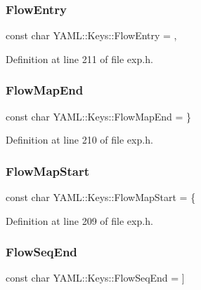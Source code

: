 \subsubsection{\texorpdfstring{FlowEntry}{FlowEntry}}
{\footnotesize\ttfamily const char Y\+A\+M\+L\+::\+Keys\+::\+Flow\+Entry = \textquotesingle{},\textquotesingle{}}



Definition at line 211 of file exp.\+h.

\mbox{\label{namespace_y_a_m_l_1_1_keys_a4522cc6d65a0d481b4ffb93a8885a621}} 
\subsubsection{\texorpdfstring{FlowMapEnd}{FlowMapEnd}}
{\footnotesize\ttfamily const char Y\+A\+M\+L\+::\+Keys\+::\+Flow\+Map\+End = \textquotesingle{}\}\textquotesingle{}}



Definition at line 210 of file exp.\+h.

\mbox{\label{namespace_y_a_m_l_1_1_keys_a0bb61fe31d7890d9801eab02edb407c2}} 
\subsubsection{\texorpdfstring{FlowMapStart}{FlowMapStart}}
{\footnotesize\ttfamily const char Y\+A\+M\+L\+::\+Keys\+::\+Flow\+Map\+Start = \textquotesingle{}\{\textquotesingle{}}



Definition at line 209 of file exp.\+h.

\mbox{\label{namespace_y_a_m_l_1_1_keys_a8a5d049c80da848b12083290a700a1ea}} 
\subsubsection{\texorpdfstring{FlowSeqEnd}{FlowSeqEnd}}
{\footnotesize\ttfamily const char Y\+A\+M\+L\+::\+Keys\+::\+Flow\+Seq\+End = \textquotesingle{}\mbox{]}\textquotesingle{}}



